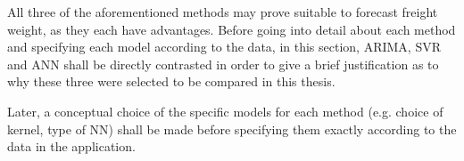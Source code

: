 \documentclass[a4paper, 11pt]{article}
\begin{document}
All three of the aforementioned methods may prove suitable to forecast freight weight, as they each have advantages. Before going into detail about each method and specifying each model according to the data, in this section, ARIMA, SVR and ANN shall be directly contrasted in order to give a brief justification as to why these three were selected to be compared in this thesis.

Later, a conceptual choice of the specific models for each method (e.g. choice of kernel, type of NN) shall be made before specifying them exactly according to the data in the application.

\end{document}

